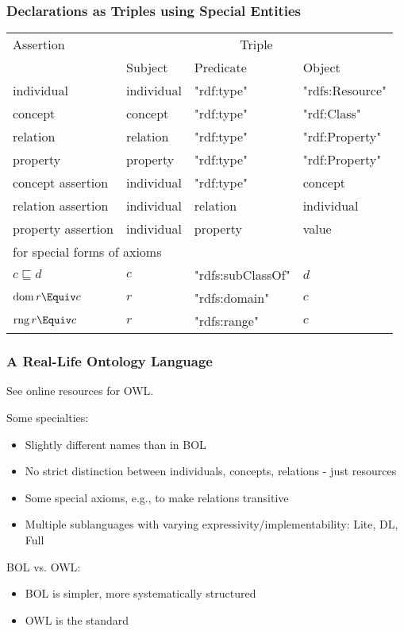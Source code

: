 \begin{frame}\frametitle{Declarations as Triples using Special Entities}
\begin{center}
\begin{tabular}{l|lll}
Assertion & \multicolumn{3}{c}{Triple} \\
          & Subject & Predicate & Object \\
\hline
individual & individual & "rdf:type" & "rdfs:Resource" \\
concept  & concept & "rdf:type" & "rdf:Class" \\
relation & relation & "rdf:type" & "rdf:Property" \\
property & property & "rdf:type" & "rdf:Property" \\
concept assertion  & individual & "rdf:type" & concept \\
relation assertion & individual & relation & individual \\
property assertion & individual & property & value \\
\hline
\multicolumn{4}{l}{for special forms of axioms}\\
$c\sqsubseteq d$ & $c$ & "rdfs:subClassOf" & $d$ \\
$\dom\,r\Equiv c$ & $r$ & "rdfs:domain" & $c$ \\
$\rng\, r\Equiv c$ & $r$ & "rdfs:range" & $c$ \\
\end{tabular}
\end{center}
\end{frame}

\begin{frame}\frametitle{A Real-Life Ontology Language}
See online resources for OWL.

Some specialties:
\begin{itemize}
\item Slightly different names than in BOL
\item No strict distinction between individuals, concepts, relations - just resources
\item Some special axioms, e.g., to make relations transitive
\item Multiple sublanguages with varying expressivity/implementability: Lite, DL, Full
\end{itemize}

BOL vs. OWL:
\begin{itemize}
\item BOL is simpler, more systematically structured 
\item OWL is the standard 
\end{itemize}
\end{frame}

